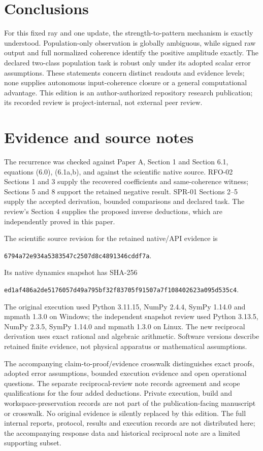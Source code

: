 \documentclass[11pt,a4paper]{article}
\begin{document}
\section{Conclusions}\label{sec:conclusion}
For this fixed ray and one update, the strength-to-pattern mechanism is exactly understood. Population-only observation is globally ambiguous, while signed raw output and full normalized coherence identify the positive amplitude exactly. The declared two-class population task is robust only under its adopted scalar error assumptions. These statements concern distinct readouts and evidence levels; none supplies autonomous input-coherence closure or a general computational advantage. This edition is an author-authorized repository research publication; its recorded review is project-internal, not external peer review.

\section*{Evidence and source notes}
The recurrence was checked against Paper A, Section 1 and Section 6.1, equations (6.0), (6.1a,b), and against the scientific native source. RFO-02 Sections 1 and 3 supply the recovered coefficients and same-coherence witness; Sections 5 and 8 support the retained negative result. SPR-01 Sections 2--5 supply the accepted derivation, bounded comparisons and declared task. The review's Section 4 supplies the proposed inverse deductions, which are independently proved in this paper.

The scientific source revision for the retained native/API evidence is
\begin{center}\small\texttt{6794a72e934a5383547c2507d8c4891346cddf7a}.\end{center}
Its native dynamics snapshot has SHA-256
\begin{center}\small\texttt{ed1af486a2de5176057d49a795bf32f83705f91507a7f108402623a095d535c4}.\end{center}
The original execution used Python 3.11.15, NumPy 2.4.4, SymPy 1.14.0 and mpmath 1.3.0 on Windows; the independent snapshot review used Python 3.13.5, NumPy 2.3.5, SymPy 1.14.0 and mpmath 1.3.0 on Linux. The new reciprocal derivation uses exact rational and algebraic arithmetic. Software versions describe retained finite evidence, not physical apparatus or mathematical assumptions.

The accompanying claim-to-proof/evidence crosswalk distinguishes exact proofs, adopted error assumptions, bounded execution evidence and open operational questions. The separate reciprocal-review note records agreement and scope qualifications for the four added deductions. Private execution, build and workspace-preservation records are not part of the publication-facing manuscript or crosswalk. No original evidence is silently replaced by this edition. The full internal reports, protocol, results and execution records are not distributed here; the accompanying response data and historical reciprocal note are a limited supporting subset.
\end{document}
